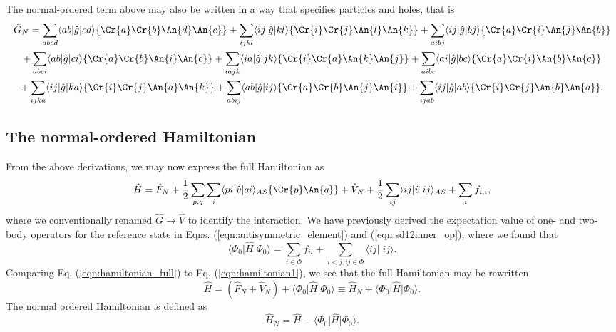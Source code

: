 The normal-ordered term above may also be written in a way that specifies particles and holes, that is
\begin{multline}
\hat{G}_N = \sum_{abcd} \langle ab\vert \hat{g} \vert cd \rangle \{ \Cr{a} \Cr{b} \An{d} \An{c} \}
+  \sum_{ijkl} \langle ij\vert \hat{g} \vert kl \rangle \{ \Cr{i} \Cr{j} \An{l} \An{k} \}
+  \sum_{aibj} \langle ij\vert \hat{g} \vert bj \rangle \{ \Cr{a} \Cr{i} \An{j} \An{b} \} \\
+  \sum_{abci} \langle ab \vert \hat{g} \vert ci \rangle \{ \Cr{a} \Cr{b} \An{i} \An{c} \}
+  \sum_{iajk} \langle ia\vert \hat{g} \vert jk \rangle \{ \Cr{i} \Cr{a} \An{k} \An{j} \}
+  \sum_{aibc} \langle ai\vert \hat{g} \vert bc \rangle \{ \Cr{a} \Cr{i} \An{b} \An{c} \} \\
+  \sum_{ijka} \langle ij \vert \hat{g} \vert ka \rangle \{ \Cr{i} \Cr{j} \An{a} \An{k} \}
+  \sum_{abij} \langle ab\vert \hat{g} \vert ij \rangle \{ \Cr{a} \Cr{b} \An{j} \An{i} \}
+  \sum_{ijab} \langle ij\vert \hat{g} \vert ab \rangle \{ \Cr{i} \Cr{j} \An{b} \An{a} \}.
\label{eqn:twobody_NN}
\end{multline}

\subsection{The normal-ordered Hamiltonian}

From the above derivations, we may now express the full Hamiltonian as
\begin{multline}
\hat{H} = \hat{F}_N + \frac{1}{2} \sum_{p,q}  \sum_i \langle pi \vert \hat{v} \vert qi \rangle_{AS} \{\Cr{p} \An{q} \} + \hat{V}_N + \frac{1}{2} \sum_{ij} \rangle ij \vert \hat{v} \vert ij \rangle_{AS} +  \sum_{i} f_{i,i}, 
\label{eqn:hamiltonian_full}
\end{multline}
where we conventionally renamed $\hat{G} \rightarrow \hat{V}$ to
identify the interaction.  We have previously derived the expectation
value of one- and two-body operators for the reference state in Eqns.
(\ref{eqn:antisymmetric_element}) and (\ref{eqn:sd12inner_op}), where we found
that
\begin{equation}
\langle \Phi_0 \vert  \hat{H} \vert \Phi_0 \rangle = \sum_{i \in \Phi} f_{ii} + \sum_{i < j, ij \in \Phi}  \langle ij \vert \vert ij \rangle.
\label{eqn:hamiltonian1}
\end{equation}
Comparing Eq. (\ref{eqn:hamiltonian_full}) to Eq. (\ref{eqn:hamiltonian1}), we see that the full Hamiltonian may be rewritten
\begin{equation}
\hat{H} = 
(\hat{F}_N + 
\hat{V}_N) +
\langle \Phi_0 \vert \hat{H} \vert \Phi_0 \rangle \equiv 
\hat{H}_N +
\langle \Phi_0 \vert \hat{H} \vert \Phi_0 \rangle.
\label{eqn:hamiltonian_full_N}
\end{equation}
The normal ordered Hamiltonian is defined as
\begin{equation}
\hat{H}_N = 
\hat{H}  -
\langle \Phi_0 \vert \hat{H} \vert \Phi_0 \rangle.
\label{eqn:hamiltonian_N}
\end{equation}

